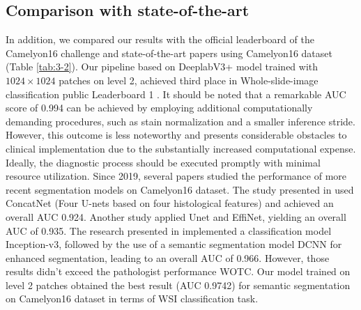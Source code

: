 \subsection{Comparison with state-of-the-art}\label{se:3-4.2}

In addition, we compared our results with the official leaderboard of the Camelyon16 challenge and state-of-the-art papers using Camelyon16 dataset (Table \ref{tab:3-2}). Our pipeline based on DeeplabV3+ model trained with $1024\times1024$ patches on level 2, achieved third place in Whole-slide-image classification public Leaderboard 1 \cite{camelyon16}. It should be noted that a remarkable AUC score of 0.994 can be achieved by employing additional computationally demanding procedures, such as stain normalization and a smaller inference stride. However, this outcome is less noteworthy and presents considerable obstacles to clinical implementation due to the substantially increased computational expense. Ideally, the diagnostic process should be executed promptly with minimal resource utilization. Since 2019, several papers studied the performance of more recent segmentation models on Camelyon16 dataset. The study presented in \cite{jin2020integrative} used ConcatNet (Four U-nets based on four histological features) and achieved an overall AUC 0.924. Another study \cite{Liu2017} applied Unet and EffiNet, yielding an overall AUC of 0.935. The research presented in \cite{Guo2019} implemented a classification model Inception-v3, followed by the use of a semantic segmentation model DCNN for enhanced segmentation, leading to an overall AUC of 0.966. However, those results didn't exceed the pathologist performance WOTC. Our model trained on level 2 patches obtained the best result (AUC 0.9742) for semantic segmentation on Camelyon16 dataset in terms of WSI classification task. 

